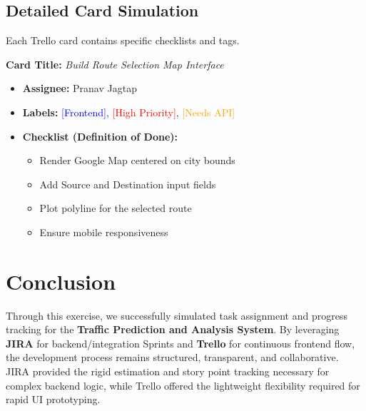 \documentclass[12pt,a4paper]{article}
\begin{document}
\subsection{Detailed Card Simulation}
Each Trello card contains specific checklists and tags.

\textbf{Card Title:} \textit{Build Route Selection Map Interface}
\begin{itemize}[noitemsep]
    \item \textbf{Assignee:} Pranav Jagtap
    \item \textbf{Labels:} \textcolor{blue}{[Frontend]}, \textcolor{red}{[High Priority]}, \textcolor{orange}{[Needs API]}
    \item \textbf{Checklist (Definition of Done):}
    \begin{itemize}[label=$\square$]
        \item Render Google Map centered on city bounds
        \item Add Source and Destination input fields
        \item Plot polyline for the selected route
        \item Ensure mobile responsiveness
    \end{itemize}
\end{itemize}

\vspace{1cm}
\begin{center}
\end{center}
\vspace{1cm}

\section{Conclusion}
Through this exercise, we successfully simulated task assignment and progress tracking for the \textbf{Traffic Prediction and Analysis System}. By leveraging \textbf{JIRA} for backend/integration Sprints and \textbf{Trello} for continuous frontend flow, the development process remains structured, transparent, and collaborative. JIRA provided the rigid estimation and story point tracking necessary for complex backend logic, while Trello offered the lightweight flexibility required for rapid UI prototyping.
\end{document}
